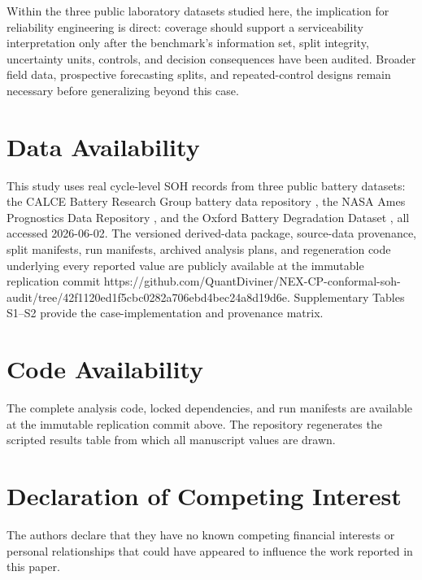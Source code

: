 \documentclass[
  number,
  preprint]{elsarticle}
\begin{document}
Within the three public laboratory datasets studied here, the
implication for reliability engineering is direct: coverage should
support a serviceability interpretation only after the benchmark's
information set, split integrity, uncertainty units, controls, and
decision consequences have been audited. Broader field data, prospective
forecasting splits, and repeated-control designs remain necessary before
generalizing beyond this case.

\section*{Data Availability}\label{data-availability}

This study uses real cycle-level SOH records from three public battery
datasets: the CALCE Battery Research Group battery data repository
\citep{calce_battery_data}, the NASA Ames Prognostics Data Repository
\citep{nasa_pcoe_battery_data}, and the Oxford Battery Degradation
Dataset \citep{howey2017oxford}, all accessed 2026-06-02. The versioned
derived-data package, source-data provenance, split manifests, run
manifests, archived analysis plans, and regeneration code underlying
every reported value are publicly available at the immutable replication
commit
https://github.com/QuantDiviner/NEX-CP-conformal-soh-audit/tree/42f1120ed1f5cbc0282a706ebd4bec24a8d19d6e.
Supplementary Tables S1--S2 provide the case-implementation and
provenance matrix.

\section*{Code Availability}\label{code-availability}

The complete analysis code, locked dependencies, and run manifests are
available at the immutable replication commit above. The repository
regenerates the scripted results table from which all manuscript values
are drawn.

\section*{Declaration of Competing
Interest}\label{declaration-of-competing-interest}

The authors declare that they have no known competing financial
interests or personal relationships that could have appeared to
influence the work reported in this paper.
\end{document}
